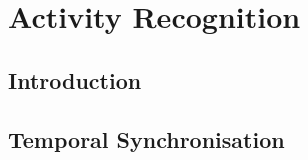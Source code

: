 \chapter{Activity Recognition}
\label{activityRecognition}

\section{Introduction}



\section{Temporal Synchronisation}